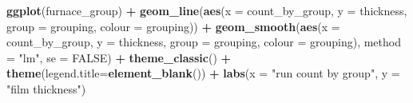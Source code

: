 \documentclass[]{book}
\newenvironment{Shaded}{\begin{snugshade}}{\end{snugshade}}
\newcommand{\CommentTok}[1]{\textcolor[rgb]{0.56,0.35,0.01}{\textit{#1}}}
\newcommand{\DataTypeTok}[1]{\textcolor[rgb]{0.13,0.29,0.53}{#1}}
\newcommand{\DecValTok}[1]{\textcolor[rgb]{0.00,0.00,0.81}{#1}}
\newcommand{\KeywordTok}[1]{\textcolor[rgb]{0.13,0.29,0.53}{\textbf{#1}}}
\newcommand{\NormalTok}[1]{#1}
\newcommand{\OperatorTok}[1]{\textcolor[rgb]{0.81,0.36,0.00}{\textbf{#1}}}
\newcommand{\OtherTok}[1]{\textcolor[rgb]{0.56,0.35,0.01}{#1}}
\newcommand{\StringTok}[1]{\textcolor[rgb]{0.31,0.60,0.02}{#1}}
\theoremstyle{definition}
\theoremstyle{definition}
\theoremstyle{definition}
\theoremstyle{remark}
\begin{document}
\begin{Shaded}
\end{Shaded}

\begin{Shaded}
\begin{Highlighting}[]
\KeywordTok{ggplot}\NormalTok{(furnace_group) }\OperatorTok{+}
\StringTok{  }\KeywordTok{geom_line}\NormalTok{(}\KeywordTok{aes}\NormalTok{(}\DataTypeTok{x =}\NormalTok{ count_by_group, }\DataTypeTok{y =}\NormalTok{ thickness, }\DataTypeTok{group =}\NormalTok{ grouping, }\DataTypeTok{colour =}\NormalTok{ grouping)) }\OperatorTok{+}
\StringTok{  }\KeywordTok{geom_smooth}\NormalTok{(}\KeywordTok{aes}\NormalTok{(}\DataTypeTok{x =}\NormalTok{ count_by_group, }\DataTypeTok{y =}\NormalTok{ thickness, }\DataTypeTok{group =}\NormalTok{ grouping, }\DataTypeTok{colour =}\NormalTok{ grouping), }
              \DataTypeTok{method =} \StringTok{"lm"}\NormalTok{, }\DataTypeTok{se =} \OtherTok{FALSE}\NormalTok{) }\OperatorTok{+}\StringTok{ }
\StringTok{  }\KeywordTok{theme_classic}\NormalTok{() }\OperatorTok{+}
\StringTok{  }\KeywordTok{theme}\NormalTok{(}\DataTypeTok{legend.title=}\KeywordTok{element_blank}\NormalTok{()) }\OperatorTok{+}
\StringTok{  }\KeywordTok{labs}\NormalTok{(}\DataTypeTok{x =} \StringTok{"run count by group"}\NormalTok{, }\DataTypeTok{y =} \StringTok{"film thickness"}\NormalTok{)}
\end{Highlighting}
\end{Shaded}
\end{document}
